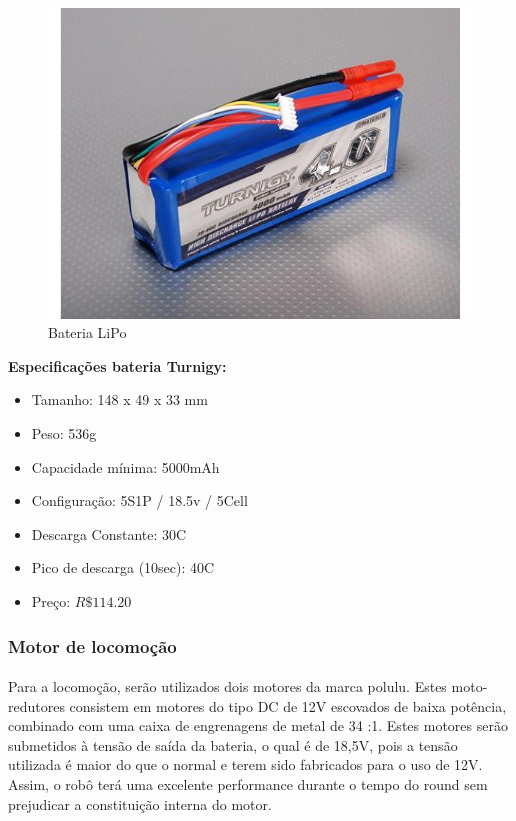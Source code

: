 \documentclass{article}
\begin{document}
                \begin{figure}[H]
                \includegraphics[width=\textwidth]{images/image02.jpg}
                \caption{Bateria LiPo}
                \centering
                \end{figure}

                \textbf{Especificações bateria Turnigy:}
                \begin{itemize}
                    \item Tamanho: 148 x 49 x 33 mm
                    \item Peso: 536g
                    \item Capacidade mínima: 5000mAh
                    \item Configuração: 5S1P / 18.5v / 5Cell
                    \item Descarga Constante: 30C
                    \item Pico de descarga (10sec): 40C
                    \item Preço: $R\$ 114.20$
                \end{itemize}

            \subsubsection{Motor de locomoção}
                \paragraph{}
                Para a locomoção, serão utilizados dois motores da marca polulu. Estes moto-redutores consistem em motores do tipo DC de 12V escovados de baixa potência, combinado com uma caixa de engrenagens de metal de 34 :1. Estes motores serão submetidos à tensão de saída da bateria, o qual é de 18,5V, pois a tensão utilizada é maior do que o normal e terem sido fabricados para o uso de 12V. Assim, o robô terá uma excelente performance durante o tempo do round sem prejudicar a constituição interna do motor.
\end{document}
